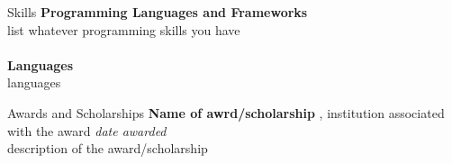 \begin{rSection}{Skills}
{\bf Programming Languages and Frameworks }
\\list whatever programming skills you have\\\\
{\bf Languages}
\\languages
\end{rSection}



\begin{rSection}{Awards and Scholarships} 
{\bf Name of awrd/scholarship}{ , institution associated with the award
} \hfill{\em date awarded}
\\description of the award/scholarship\\

\end{rSection}



